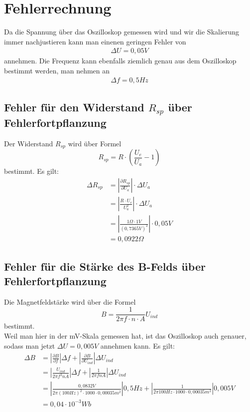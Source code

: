 \chapter{Fehlerrechnung}
	Da die Spannung über das Oszilloskop gemessen wird und wir die Skalierung immer nachjustieren kann man einenen geringen Fehler von 
\begin{align*}
	\Delta U = 0,05 V
\end{align*}
    annehmen.
    Die Frequenz kann ebenfalls ziemlich genau aus dem Oszilloskop bestimmt werden, man nehmen an 
    \begin{align*}
    	\Delta f = 0,5 Hz
    \end{align*}
	\section{Fehler für den Widerstand $R_{sp}$ über Fehlerfortpflanzung}
    	Der Widerstand $R_{sp}$ wird über Formel
        \begin{equation}
        	R_{sp} = R \cdot \left( \frac{U_e}{U_a} - 1 \right)
        \end{equation}
        bestimmt.
        Es gilt:
        \begin{align*}
        	\Delta R_{sp} &= \left|\frac{\partial R_{sp}}{\partial U_a}\right|  \cdot \Delta U_a\\
            &=\left|\frac{R\cdot U_e}{U_a^2}\right|\cdot\Delta U_a\\
			&=\left|\frac{1\Omega\cdot 1 V}{(0,7365V)^2}\right|\cdot0,05 V\\
            &=0,0922\Omega
        \end{align*}
    	
\section{Fehler für die Stärke des B-Felds über Fehlerfortpflanzung}
	
	Die Magnetfeldstärke wird über die Formel \begin{equation}
		B =\frac{1}{2 \pi f \cdot n\cdot A}U_{ind}
	\end{equation}
    bestimmt.\\
    Weil man hier in der mV-Skala gemessen hat, ist das Oszilloskop auch genauer, sodass man jetzt $\Delta U = 0,005V$ annehmen kann.
	Es gilt: 
    \begin{align*}
    	\Delta B &= \left| \frac{\partial B}{\partial f} \right| \Delta f + \left| \frac{\partial B}{\partial U_{ind}} \right| \Delta U_{ind} \\
        &=\left|\frac{U_{ind}}{2\pi f^2 n A} \right| \Delta f + \left| \frac{1}{2\pi f n A} \right| \Delta U_{ind}\\
       &=\left|\frac{0,0832V}{2\pi (100Hz)^2 \cdot 1000 \cdot 0,00035m^2} \right| 0,5 Hz + \left| \frac{1}{2\pi 100Hz \cdot 1000 \cdot 0,00035 m^2} \right| 0,005V\\
       & = 0,04 \cdot 10^{-3} Wb
       \end{align*}



\pagebreak